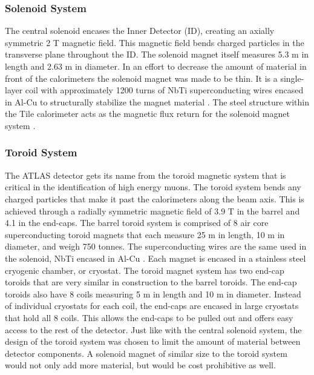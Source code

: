 	\subsubsection{Solenoid System}\label{sssec:solenoid}
	The central solenoid encases the Inner Detector (ID), creating an axially symmetric 2 T magnetic field. This magnetic field bends charged particles in the transverse plane throughout the ID. The solenoid magnet itself measures 5.3 m in length and 2.63 m in diameter. In an effort to decrease the amount of material in front of the calorimeters the solenoid magnet was made to be thin. It is a single-layer coil with approximately 1200 turns of NbTi superconducting wires encased in Al-Cu to structurally stabilize the magnet material \cite{atlas-solenoid}. The steel structure within the Tile calorimeter acts as the magnetic flux return for the solenoid magnet system \cite{ATLAS-tile}.

	\subsubsection{Toroid System}\label{sssec:toroid}
	The ATLAS detector gets its name from the toroid magnetic system that is critical in the identification of high energy muons. The toroid system bends any charged particles that make it past the calorimeters along the beam axis. This is achieved through a radially symmetric magnetic field of 3.9 T in the barrel and 4.1 in the end-caps. The barrel toroid system is comprised of 8 air core superconducting toroid magnets that each measure 25 m in length, 10 m in diameter, and weigh 750 tonnes. The superconducting wires are the same used in the solenoid, NbTi encased in Al-Cu \cite{atlas-toroid}. Each magnet is encased in a stainless steel cryogenic chamber, or cryostat. The toroid magnet system has two end-cap toroids that are very similar in construction to the barrel toroids. The end-cap toroids also have 8 coils measuring 5 m in length and 10 m in diameter. Instead of individual cryostats for each coil, the end-caps are encased in large cryostats that hold all 8 coils. This allows the end-caps to be pulled out and offers easy access to the rest of the detector. Just like with the central solenoid system, the design of the toroid system was chosen to limit the amount of material between detector components. A solenoid magnet of similar size to the toroid system would not only add more material, but would be cost prohibitive as well.


